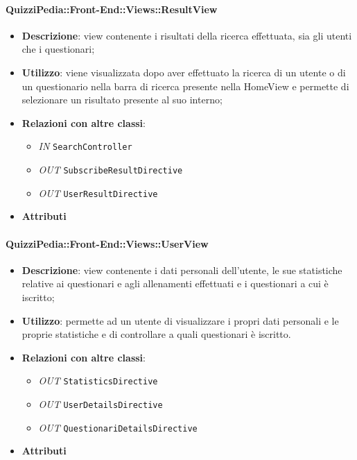 \paragraph{QuizziPedia::Front-End::Views::ResultView}
\begin{itemize}
	\item \textbf{Descrizione}: view contenente i risultati della ricerca effettuata, sia gli utenti che i questionari;
	\item \textbf{Utilizzo}: viene visualizzata dopo aver effettuato la ricerca di un utente o di un questionario nella barra di ricerca presente nella HomeView e permette di selezionare un risultato presente al suo interno; 
	\item \textbf{Relazioni con altre classi}:
	\begin{itemize}
		\item \textit{IN} \texttt{SearchController} \\
		\item \textit{OUT} \texttt{SubscribeResultDirective} \\
		\item \textit{OUT} \texttt{UserResultDirective} \\ 
	\end{itemize}
	\item \textbf{Attributi}
\end{itemize}

\paragraph{QuizziPedia::Front-End::Views::UserView}
\begin{itemize}
	\item \textbf{Descrizione}: view contenente i dati personali dell'utente, le sue statistiche relative ai questionari e agli allenamenti effettuati e i questionari a cui è iscritto;
	\item \textbf{Utilizzo}:  permette ad un utente di visualizzare i propri dati personali e le proprie statistiche e di controllare a quali questionari è iscritto. 
	\item \textbf{Relazioni con altre classi}:
	\begin{itemize}
		\item \textit{OUT} \texttt{StatisticsDirective}
		\item \textit{OUT} \texttt{UserDetailsDirective}
		\item \textit{OUT} \texttt{QuestionariDetailsDirective}
	\end{itemize}
	\item \textbf{Attributi}
\end{itemize}

